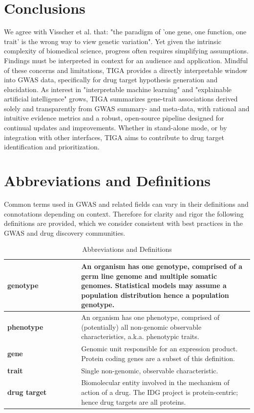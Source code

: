\section{Conclusions}

We agree with Visscher et al. that: "the paradigm of 'one gene, one function, one trait' is the wrong way to view genetic variation"\cite{Visscher2017-jp}. Yet given the intrinsic complexity of biomedical science, progress often requires simplifying assumptions. Findings must be interpreted in context for an audience and application. Mindful of these concerns and limitations, TIGA provides a directly interpretable window into GWAS data, specifically for drug target hypothesis generation and elucidation. As interest in "interpretable machine learning" and "explainable artificial intelligence"\cite{Gilpin2018-da} grows, TIGA summarizes gene-trait associations derived solely and transparently from GWAS summary- and meta-data, with rational and intuitive evidence metrics and a robust, open-source pipeline designed for continual updates and improvements. Whether in stand-alone mode, or by integration with other interfaces, TIGA aims to contribute to drug target identification and prioritization. 

\section{Abbreviations and Definitions}

Common terms used in GWAS and related fields can vary in their definitions and connotations depending on context. Therefore for clarity and rigor the following definitions are provided, which we consider consistent with best practices in the GWAS and drug discovery communities.

\begin{table}
\caption{Abbreviations and Definitions}
\begin{center}
\begin{tabular}{|p{0.3\linewidth}|p{0.7\linewidth}|}
\hline
\textbf{genotype}
& An organism has one genotype, comprised of a germ line genome and multiple somatic genomes. Statistical models may assume a population distribution hence a population genotype. \\
\hline
\textbf{phenotype}
& An organism has one phenotype, comprised of (potentially) all non-genomic observable characteristics, a.k.a. phenotypic traits. \\
\hline
\textbf{gene}
& Genomic unit responsible for an expression product. Protein coding genes are a subset of this definition.  \\
\hline
\textbf{trait}
& Single non-genomic, observable characteristic. \\
\hline
\textbf{drug target}
& Biomolecular entity involved in the mechanism of action of a drug. The IDG project is protein-centric; hence drug targets are all proteins. \\
\hline
\end{tabular}
\end{center}
\end{table}

